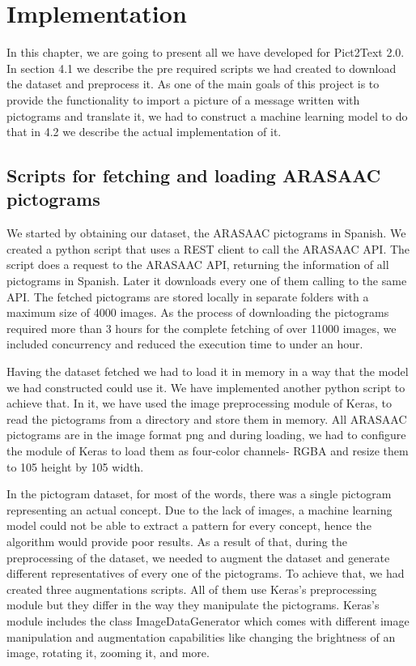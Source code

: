 \chapter{Implementation}
\label{Implementation}

In this chapter, we are going to present all we have developed for Pict2Text 2.0. In section 4.1 we describe the pre required scripts we had created to download the dataset and preprocess it. As one of the main goals of this project is to provide the functionality to import a picture of a message written with pictograms and translate it, we had to construct a machine learning model to do that in 4.2 we describe the actual implementation of it. 

\section{Scripts for fetching and loading ARASAAC pictograms}
We started by obtaining our dataset, the ARASAAC pictograms in Spanish. We created a python script that uses a REST client to call the ARASAAC API. The script does a request to the ARASAAC API, returning the information of all pictograms in Spanish. Later it downloads every one of them calling to the same API. The fetched pictograms are stored locally in separate folders with a maximum size of 4000 images. As the process of downloading the pictograms required more than 3 hours for the complete fetching of over 11000 images, we included concurrency and reduced the execution time to under an hour. 

Having the dataset fetched we had to load it in memory in a way that the model we had constructed could use it. We have implemented another python script to achieve that. In it, we have used the image preprocessing module of Keras, to read the pictograms from a directory and store them in memory. All ARASAAC pictograms are in the image format png and during loading, we had to configure the module of Keras to load them as four-color channels- RGBA and resize them to 105 height by 105 width.

In the pictogram dataset, for most of the words, there was a single pictogram representing an actual concept. Due to the lack of images, a machine learning model could not be able to extract a pattern for every concept, hence the algorithm would provide poor results. As a result of that, during the preprocessing of the dataset, we needed to augment the dataset and generate different representatives of every one of the pictograms. To achieve that, we had created three augmentations scripts. All of them use Keras's preprocessing module but they differ in the way they manipulate the pictograms. Keras's module includes the class ImageDataGenerator which comes with different image manipulation and augmentation capabilities like changing the brightness of an image, rotating it, zooming it, and more.

